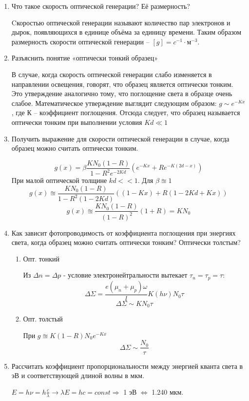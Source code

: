 \documentclass[a4paper]{article}
\begin{document}
\begin{enumerate}
    \item Что такое скорость оптической генерации? Её размерность? \par 
    Cкоростью оптической генерации называют количество пар электронов и дырок, появляющихся в единице объёма за единицу времени. Таким образом размерность скорости оптической генерации – $[g] = c^{-1} \cdot м^{-3}$.

    \item Разъяснить понятие «оптически тонкий образец» \par 
    В случае, когда скорость оптической генерации слабо изменяется в направлении освещения, говорят, что образец является оптически тонким. Это утверждение аналогично тому, что поглощение света в образце очень слабое. Математическое утверждение выглядит следующим образом:
    $g \sim e^{-Kx}$ , где К – коэффициент поглощения. Отсюда следует, что образец называется оптически тонким при выполнении условия $Kd \ll 1$ 

    \item  Получить выражение для скорости оптической генерации в случае, когда образец можно считать оптически тонким. \par 
    $$g(x) = \beta \frac{KN_0 (1-R)}{1 - R^2 e^{-2Kd}} (e^{-Kx} + Re^{-K(2d-x)})$$
    При малой оптической толщине $kd<<1$. Для $\beta \approxeq 1$
    $$g(x) \approxeq \frac{KN_0(1-R)}{1-R^2(1-2Kd)} ((1-Kx) + R(1-2Kd + Kx))$$
    $$g(x) \approxeq \frac{KN_0 (1-R)}{(1-R)^2} (1+R) = KN_0$$

    \item Как зависит фотопроводимость от коэффициента поглощения при энергиях света, когда образец можно считать оптически тонким? Оптически толстым? \par
    \begin{enumerate}
        \item Опт. тонкий \par 
        Из $\Delta n = \Delta p$ - условие электронейтральности вытекает $\tau_n = \tau_p = \tau$:
        $$\Delta \Sigma = \frac{e(\mu_n + \mu_p) \omega}{l} K(h\nu) N_0 \tau$$
        $$\Delta \Sigma \sim KN_0\tau$$

        \item Опт. толстый \par 
        При $g \approxeq K(1-R)N_0 e^{-Kx}$
        $$\Delta \Sigma \sim \frac{N_0}{\tau}$$
    \end{enumerate}

    \item Рассчитать коэффициент пропорциональности между энергией кванта света в эВ и соответствующей длиной волны в мкм.\par 
    $E = h \nu = h \frac{c}{\lambda} \longrightarrow \lambda E = hc = const \Longrightarrow$ 1 эВ $\Leftrightarrow$ 1.240 мкм.


\end{enumerate}
\end{document}
